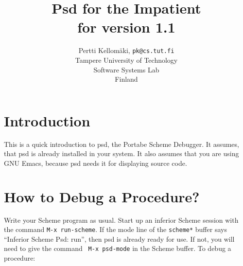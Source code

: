 %
%

%
%
%
%
%
%
%
%
%
%



\newcommand{\scheme}[1]{{\tt #1}}

\author{Pertti Kellom\"aki, {\tt pk@cs.tut.fi}\\ 
\small Tampere University of Technology \\
\small Software Systems Lab \\
\small Finland}
\title{Psd for the Impatient \\ \small for version 1.1}
\maketitle

\section{Introduction}
\label{sec:intro}

This is a quick introduction to psd, the Portabe Scheme Debugger.  It
assumes, that psd is already installed in your system. It also assumes
that you are using GNU Emacs, because psd needs it for displaying
source code.

\section{How to Debug a Procedure?}

Write your Scheme program as usual.  Start up an inferior Scheme
session with the command {\tt M-x run-scheme}. If the mode line of the
{\tt *scheme*} buffer says ``Inferior Scheme Psd: run'', then psd is
already ready for use. If not, you will need to give the command {\tt
M-x psd-mode} in the Scheme buffer.  To debug a procedure:

